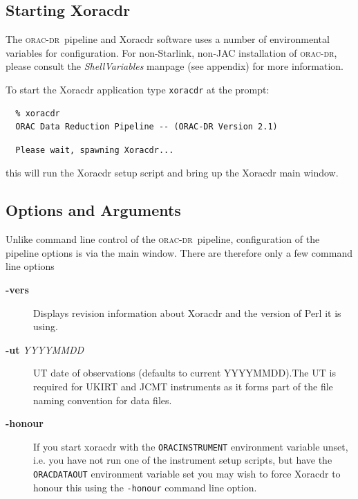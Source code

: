 \documentclass[twoside,11pt]{article}
\renewcommand{\_}{\texttt{\symbol{95}}}
\newcommand{\oracdr}{\textsc{orac-dr}}
\begin{document}
\subsection*{Starting Xoracdr\label{Xoracdr_STARTING_XORACDR}}

The \oracdr\ pipeline and Xoracdr software uses a number of
environmental variables for configuration. For non-Starlink, non-JAC
installation of \oracdr, please consult the \emph{ShellVariables} manpage (see
appendix) for more information.



To start the Xoracdr application type \texttt{xoracdr} at the prompt:

\begin{verbatim}
  % xoracdr
  ORAC Data Reduction Pipeline -- (ORAC-DR Version 2.1)
\end{verbatim}
\begin{verbatim}
  Please wait, spawning Xoracdr...
\end{verbatim}


this will run the Xoracdr setup script and bring up the Xoracdr main window.

\subsection*{Options and Arguments\label{Xoracdr_OPTIONS_AND_ARGUMENTS}}

Unlike command line control of the \oracdr\ pipeline, configuration of
the pipeline options is via the main window. There are therefore only
a few command line options

\begin{description}
\item[\textbf{-vers}] \mbox{}

Displays revision information about Xoracdr and the version of Perl it
is using.

\item[\textbf{-ut} \textit{YYYYMMDD}] \mbox{}

UT date of observations (defaults to current YYYYMMDD).The UT is
required for UKIRT and JCMT instruments as it forms part of the file
naming convention for data files.

\item[\textbf{-honour}] \mbox{}

If you start xoracdr with the \texttt{ORAC\_INSTRUMENT} environment variable
unset, i.e. you have not run one of the instrument setup scripts, but
have the \texttt{ORAC\_DATA\_OUT} environment variable set you may wish to
force Xoracdr to honour this using the \texttt{-honour} command line option.

\end{description}
\end{document}

